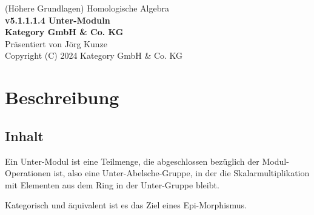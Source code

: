 \documentclass[a4paper]{amsart}
\theoremstyle{definition}
\begin{document}
\begin{titlepage}
\centering
{\huge
(Höhere Grundlagen) Homologische Algebra\\[1cm]
\textbf{v5.1.1.1.4 Unter-Moduln}
}\\[1cm]

\textbf{Kategory GmbH \& Co. KG}\\
Präsentiert von Jörg Kunze\\
Copyright (C) 2024 Kategory GmbH \& Co. KG

\end{titlepage}

%

\newpage

\section*{Beschreibung}

\subsection*{Inhalt}
Ein Unter-Modul ist eine Teilmenge, die abgeschlossen bezüglich der Modul-Operationen ist, also eine Unter-Abelsche-Gruppe, in der die Skalarmultiplikation mit Elementen aus dem Ring in der Unter-Gruppe bleibt.

Kategorisch und äquivalent ist es das Ziel eines Epi-Morphismus.
\end{document}
